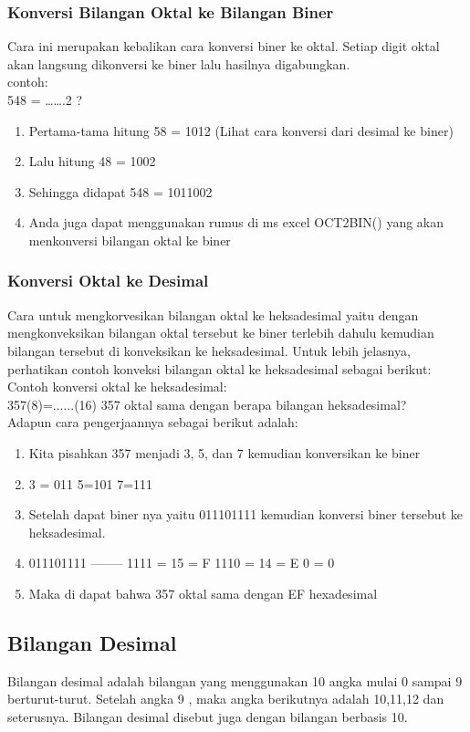 \subsubsection{Konversi Bilangan Oktal ke Bilangan Biner}
Cara ini merupakan kebalikan cara konversi biner ke oktal. Setiap digit oktal akan langsung dikonversi ke biner lalu hasilnya digabungkan.
\\contoh:
\\548 = …….2 ?
\\
\begin{enumerate}
\item Pertama-tama hitung 58 = 1012 (Lihat cara konversi dari desimal ke biner)
\item Lalu hitung 48 = 1002
\item Sehingga didapat 548 = 1011002
\item Anda juga dapat menggunakan rumus di ms excel OCT2BIN() yang akan menkonversi bilangan oktal ke biner
\end{enumerate}

\subsubsection{Konversi Oktal ke Desimal}
Cara untuk mengkorvesikan bilangan oktal ke heksadesimal yaitu dengan mengkonveksikan bilangan oktal tersebut ke biner terlebih dahulu kemudian bilangan tersebut di konveksikan ke heksadesimal. Untuk lebih jelasnya, perhatikan contoh konveksi bilangan oktal ke heksadesimal sebagai berikut:
\\ Contoh konversi oktal ke heksadesimal:
\\357(8)=......(16) 357 oktal sama dengan berapa bilangan heksadesimal?
\\Adapun cara pengerjaannya sebagai berikut adalah:
\begin{enumerate}
\item Kita pisahkan 357 menjadi 3, 5, dan 7 kemudian konversikan ke biner 
\item 3 = 011 5=101 7=111
\item Setelah dapat biner nya yaitu 011101111 kemudian konversi biner tersebut ke heksadesimal. 
\item 011101111 -------- 1111 = 15 = F 1110 = 14 = E 0 = 0
\item Maka di dapat bahwa 357 oktal sama dengan EF hexadesimal 
\end{enumerate}

\subsection{Bilangan Desimal}
Bilangan desimal adalah bilangan yang menggunakan 10 angka mulai 0 sampai 9 berturut-turut. Setelah angka 9 , maka angka berikutnya adalah 10,11,12 dan seterusnya. Bilangan desimal disebut juga dengan bilangan berbasis 10.
